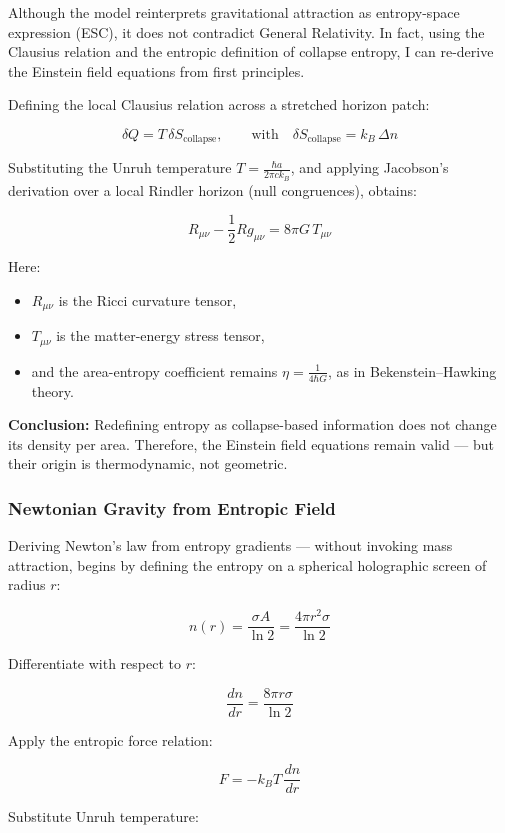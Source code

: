 \documentclass[12pt]{article}
\begin{document}
Although the model reinterprets gravitational attraction as entropy-space expression (ESC), it does not contradict General Relativity. In fact, using the Clausius relation and the entropic definition of collapse entropy, I can re-derive the Einstein field equations from first principles.

Defining the local Clausius relation across a stretched horizon patch:

\[
\delta Q = T \, \delta S_{\!\text{collapse}}, \qquad \text{with} \quad \delta S_{\!\text{collapse}} = k_{\!B} \, \Delta n
\]

Substituting the Unruh temperature \( T = \frac{\hbar a}{2\pi c k_{\!B}} \), and applying Jacobson’s derivation over a local Rindler horizon (null congruences), obtains:

\[
R_{\mu\nu} - \frac{1}{2} R g_{\mu\nu} = 8\pi G \, T_{\mu\nu}
\]

Here:
\begin{itemize}
    \item \( R_{\mu\nu} \) is the Ricci curvature tensor,
    \item \( T_{\mu\nu} \) is the matter-energy stress tensor,
    \item and the area-entropy coefficient remains \( \eta = \frac{1}{4 \hbar G} \), as in Bekenstein–Hawking theory.
\end{itemize}

\noindent
\textbf{Conclusion:} Redefining entropy as collapse-based information does not change its density per area. Therefore, the Einstein field equations remain valid — but their origin is thermodynamic, not geometric.

\subsubsection*{Newtonian Gravity from Entropic Field}

Deriving Newton’s law from entropy gradients — without invoking mass attraction, begins by defining the entropy on a spherical holographic screen of radius $r$:

\[
n(r) = \frac{\sigma A}{\ln 2} = \frac{4\pi r^2 \sigma}{\ln 2}
\]

Differentiate with respect to $r$:

\[
\frac{dn}{dr} = \frac{8\pi r \sigma}{\ln 2}
\]

Apply the entropic force relation:

\[
F = -k_{\!B} T \, \frac{dn}{dr}
\]

Substitute Unruh temperature:
\end{document}
